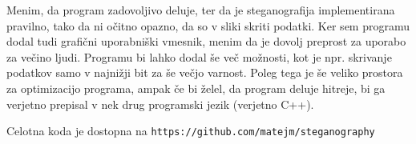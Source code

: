 Menim, da program zadovoljivo deluje, ter da je steganografija implementirana pravilno, tako da ni očitno opazno, da so v sliki skriti podatki. Ker sem programu dodal tudi grafični uporabniški vmesnik, menim da je dovolj preprost za uporabo za večino ljudi. Programu bi lahko dodal še več možnosti, kot je npr. skrivanje podatkov samo v najnižji bit za še večjo varnost. Poleg tega je še veliko prostora za optimizacijo programa, ampak če bi želel, da program deluje hitreje, bi ga verjetno prepisal v nek drug programski jezik (verjetno C++).


Celotna koda je dostopna na \texttt{https://github.com/matejm/steganography}
